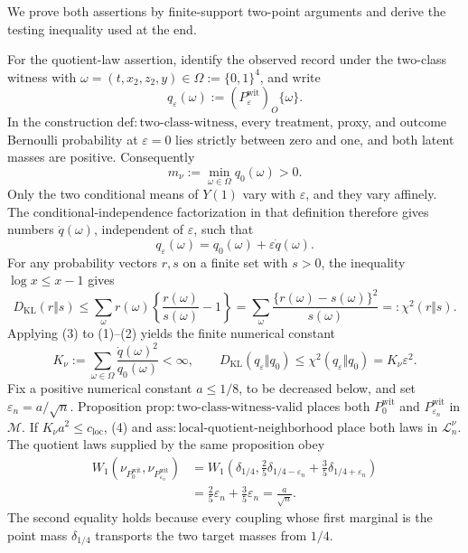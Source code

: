 We prove both assertions by finite-support two-point arguments and derive the testing inequality used at the end.

For the quotient-law assertion, identify the observed record under the two-class witness with
\(\omega=(t,x_2,z_2,y)\in\Omega:=\{0,1\}^4\), and write
\[
 q_\varepsilon(\omega):=(P_\varepsilon^{\mathrm{wit}})_O\{\omega\}.
\]
In the construction \(\mathrm{def:two\text{-}class\text{-}witness}\), every treatment, proxy, and outcome Bernoulli probability at \(\varepsilon=0\) lies strictly between zero and one, and both latent masses are positive.  Consequently
\[
 m_\nu:=\min_{\omega\in\Omega}q_0(\omega)>0.                                      \tag{1}
\]
Only the two conditional means of \(Y(1)\) vary with \(\varepsilon\), and they vary affinely.  The conditional-independence factorization in that definition therefore gives numbers \(\dot q(\omega)\), independent of \(\varepsilon\), such that
\[
 q_\varepsilon(\omega)=q_0(\omega)+\varepsilon\dot q(\omega).                    \tag{2}
\]
For any probability vectors \(r,s\) on a finite set with \(s>0\), the inequality \(\log x\le x-1\) gives
\[
 D_{\mathrm{KL}}(r\Vert s)
 \le \sum_\omega r(\omega)\left\{\frac{r(\omega)}{s(\omega)}-1\right\}
 =\sum_\omega\frac{\{r(\omega)-s(\omega)\}^2}{s(\omega)}
 =:\chi^2(r\Vert s).                                                              \tag{3}
\]
Applying (3) to (1)--(2) yields the finite numerical constant
\[
 K_\nu:=\sum_{\omega\in\Omega}\frac{\dot q(\omega)^2}{q_0(\omega)}<\infty,
 \qquad
 D_{\mathrm{KL}}(q_\varepsilon\Vert q_0)
 \le\chi^2(q_\varepsilon\Vert q_0)=K_\nu\varepsilon^2.                         \tag{4}
\]
Fix a positive numerical constant \(a\le1/8\), to be decreased below, and set \(\varepsilon_n=a/\sqrt n\).  Proposition \(\mathrm{prop:two\text{-}class\text{-}witness\text{-}valid}\) places both \(P_0^{\mathrm{wit}}\) and \(P_{\varepsilon_n}^{\mathrm{wit}}\) in \(\mathcal M\).  If \(K_\nu a^2\le c_{\mathrm{loc}}\), (4) and \(\mathrm{ass:local\text{-}quotient\text{-}neighborhood}\) place both laws in \(\mathcal L_n^\nu\).  The quotient laws supplied by the same proposition obey
\[
 \begin{split}
 W_1\!\left(\nu_{P_0^{\mathrm{wit}}},\nu_{P_{\varepsilon_n}^{\mathrm{wit}}}\right)
 &=W_1\!\left(\delta_{1/4},\frac25\delta_{1/4-\varepsilon_n}
                   +\frac35\delta_{1/4+\varepsilon_n}\right)\\
 &=\frac25\varepsilon_n+\frac35\varepsilon_n
 =\frac a{\sqrt n}.                                                               \tag{5}
 \end{split}
\]
The second equality holds because every coupling whose first marginal is the point mass \(\delta_{1/4}\) transports the two target masses from \(1/4\).

